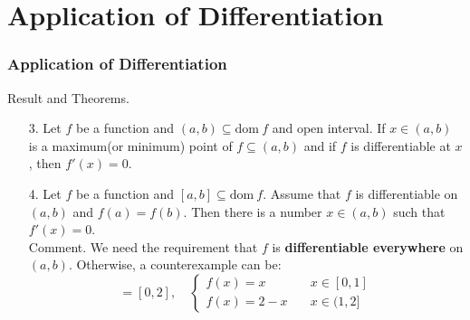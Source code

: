 \documentclass[12pt, t]{beamer}
\begin{document}
\section{Application of Differentiation}
\begin{frame}
    \frametitle{Application of Differentiation}
Result and Theorems.\\
\begin{enumerate}
    \item[3.] Let $f$ be a function and $(a,b)\subseteq \text{dom}\  f$ and open interval. If $x\in(a,b)$ is a 
        maximum(or minimum) point of $f\subseteq(a,b)$ and if $f$ is differentiable at $x$, then $f'(x)=0$.
    \vspace{0.5em}
    \item[4.] Let $f$ be a function and $[a,b]\subseteq \text{dom}\  f$. Assume that $f$ is differentiable on $(a,b)$ and 
        $f(a)=f(b)$. Then there is a number $x\in(a,b)$ such that $f'(x)=0$.\\
        \vspace{0.3em}
        Comment. We need the requirement that $f$ is \textbf{differentiable everywhere} on $(a,b)$. Otherwise, a 
        counterexample can be:
        \begin{equation*}
            [a,b]=[0,2],\quad 
            \begin{cases}
                f(x)=x\qquad &x\in[0,1]\\
                f(x)=2-x\quad &x\in(1,2]
            \end{cases}
        \end{equation*}
        
\end{enumerate}


\end{frame}
\end{document}
